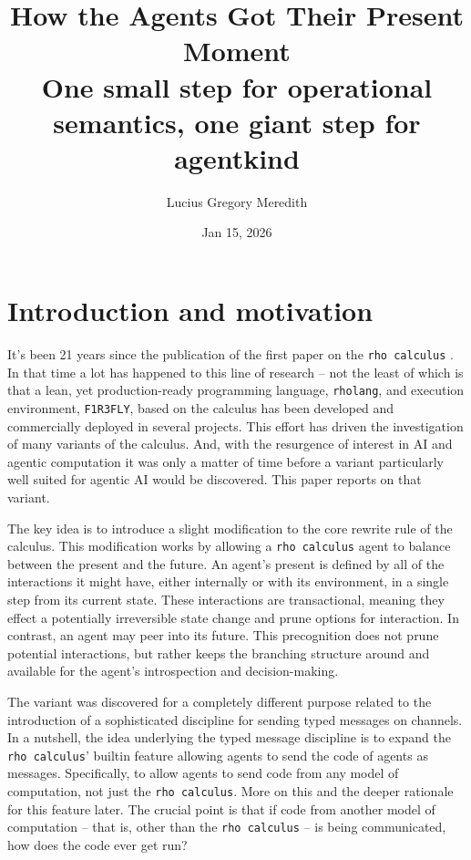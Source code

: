 \documentclass{article}
\title{How the Agents Got Their Present Moment \\ \large One small step for operational semantics, one giant step for agentkind}
\author{Lucius Gregory Meredith}
\date{Jan 15, 2026}
\newcommand{\code}[1]{\texttt{#1}}
\begin{document}
\maketitle

\section{Introduction and motivation}

It's been 21 years since the publication of the first paper on the \code{rho calculus} \cite{DBLP:journals/entcs/MeredithR05}. In that time a lot has happened to this line of research – not the least of which is that a lean, yet production-ready programming language, \code{rholang}, and execution environment, \code{F1R3FLY}, based on the calculus has been developed and commercially deployed in several projects. This effort has driven the investigation of many variants of the calculus. And, with the resurgence of interest in AI and agentic computation it was only a matter of time before a variant particularly well suited for agentic AI would be discovered. This paper reports on that variant.

\medskip

The key idea is to introduce a slight modification to the core rewrite rule of the calculus. This modification works by allowing a \code{rho calculus} agent to balance between the present and the future. An agent's present is defined by all of the interactions it might have, either internally or with its environment, in a single step from its current state. These interactions are transactional, meaning they effect a potentially irreversible state change and prune options for interaction. In contrast, an agent may peer into its future. This precognition does not prune potential interactions, but rather keeps the branching structure around and available for the agent's introspection and decision-making.

\medskip

The variant was discovered for a completely different purpose related to the introduction of a sophisticated discipline for sending typed messages on channels. In a nutshell, the idea underlying the typed message discipline is to expand the \code{rho calculus}' builtin feature allowing agents to send the code of agents as messages. Specifically, to allow agents to send code from any model of computation, not just the \code{rho calculus}. More on this and the deeper rationale for this feature later. The crucial point is that if code from another model of computation – that is, other than the \code{rho calculus} – is being communicated, how does the code ever get run?
\end{document}
